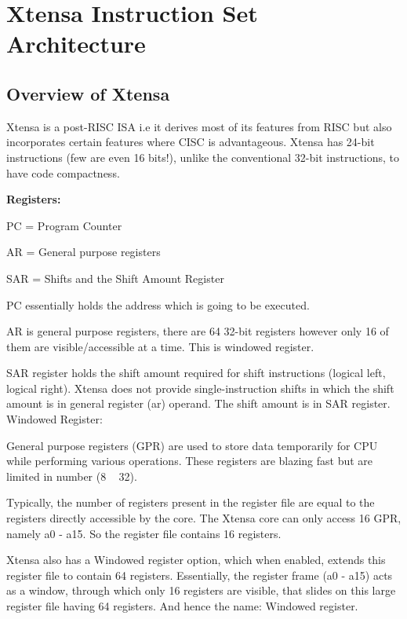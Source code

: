 \chapter{Xtensa Instruction Set Architecture}
\pagestyle{plain}
\setlength{\parindent}{2em}
\setlength{\parskip}{1em}

\section{Overview of Xtensa}


   Xtensa is a post-RISC ISA i.e it derives most of its features from RISC but also incorporates 
certain features where CISC is advantageous. Xtensa has 24-bit instructions (few are even 16 bits!),
unlike the conventional 32-bit instructions, to have code compactness.

  \textbf{Registers:}

  PC = Program Counter

  AR = General purpose registers

  SAR = Shifts and the Shift Amount Register

  PC essentially holds the address which is going to be executed.

  AR is general purpose registers, there are 64 32-bit registers however only 16 of them are 
visible/accessible at a time. This is windowed register.

  SAR register holds the shift amount required for shift instructions (logical left, logical right). 
Xtensa does not provide single-instruction shifts in which the shift amount is in general register 
(ar) operand. The shift amount is in SAR register.
  Windowed Register:

  General purpose registers (GPR) are used to store data temporarily for CPU while performing various operations. These registers are blazing fast but are limited in number (8 ~ 32).

  Typically, the number of registers present in the register file are equal to the registers directly accessible by the core. The Xtensa core can only access 16 GPR, namely a0 - a15. So the register file contains 16 registers.

  Xtensa also has a Windowed register option, which when enabled, extends this register file to contain 64 registers. Essentially, the register frame (a0 - a15) acts as a window, through which only 16 registers are visible, that slides on this large register file having 64 registers. And hence the name: Windowed register.

